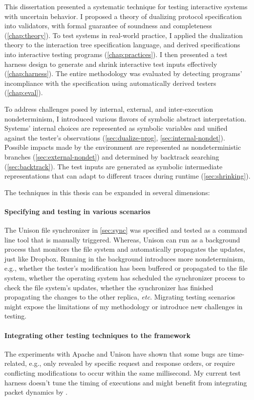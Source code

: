 This dissertation presented a systematic technique for testing interactive systems
with uncertain behavior.  I proposed a theory of dualizing protocol
specification into validators, with formal guarantee of soundness and
completeness (\autoref{chap:theory}).  To test systems in real-world practice, I
applied the dualization theory to the interaction tree specification language,
and derived specifications into interactive testing programs
(\autoref{chap:practices}).  I then presented a test harness design to generate
and shrink interactive test inputs effectively (\autoref{chap:harness}).  The
entire methodology was evaluated by detecting programs' incompliance with the
specification using automatically derived testers (\autoref{chap:eval}).

To address challenges posed by internal, external, and inter-execution
nondeterminism, I introduced various flavors of symbolic abstract
interpretation.  Systems' internal choices are represented as symbolic variables
and unified against the tester's observations (\autoref{sec:dualize-prog},
\autoref{sec:internal-nondet}).  Possible impacts made by the environment are
represented as nondeterministic branches (\autoref{sec:external-nondet}) and
determined by backtrack searching (\autoref{sec:backtrack}).  The test inputs
are generated as symbolic intermediate representations that can adapt to
different traces during runtime (\autoref{sec:shrinking}).

The techniques in this thesis can be expanded in several dimensions:
\paragraph{Specifying and testing in various scenarios}
The Unison file synchronizer in \autoref{sec:sync} was specified and tested as a
command line tool that is manually triggered.  Whereas, Unison can run as a
background process that monitors the file system and automatically propagates
the updates, just like Dropbox.  Running in the background introduces more
nondeterminism, e.g., whether the tester's modification has been buffered or
propagated to the file system, whether the operating system has scheduled the
synchronizer process to check the file system's updates, whether the
synchronizer has finished propagating the changes to the other replica, {\it
etc}.  Migrating testing scenarios might expose the limitations of my
methodology or introduce new challenges in testing.

\paragraph{Integrating other testing techniques to the framework}
The experiments with Apache and Unison have shown that some bugs are
time-related, e.g., only revealed by specific request and response orders, or
require conflicting modifications to occur within the same millisecond.  My
current test harness doesn't tune the timing of executions and might benefit
from integrating packet dynamics by \citet{pkt-dyn}.

